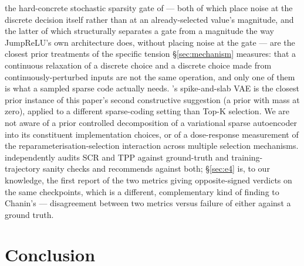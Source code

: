 \documentclass[11pt]{article}
\begin{document}
the hard-concrete
stochastic sparsity gate of \citet{louizos2018learning} --- both of which
place noise at the discrete decision itself rather than at an
already-selected value's magnitude, and the latter of which structurally
separates a gate from a magnitude the way JumpReLU's own architecture does,
without placing noise at the gate --- are the closest prior treatments of
the specific tension \S\ref{sec:mechanism} measures: that a continuous
relaxation of a discrete choice and a discrete choice made from
continuously-perturbed inputs are not the same operation, and only one of
them is what a sampled sparse code actually needs.
\citet{tonolini2020variational}'s spike-and-slab VAE is the closest prior
instance of this paper's second constructive suggestion (a prior with mass
at zero), applied to a different sparse-coding setting than Top-K
selection. We are not aware of a prior controlled decomposition of a
variational sparse autoencoder into its constituent implementation choices,
or of a dose-response measurement of the reparameterisation-selection
interaction across multiple selection mechanisms. \citet{chanin2026reliable}
independently audits SCR and TPP against ground-truth and training-
trajectory sanity checks and recommends against both; \S\ref{sec:e4} is, to our knowledge, the first report of the two
metrics giving opposite-signed verdicts on the same checkpoints, which is a
different, complementary kind of finding to Chanin's --- disagreement
between two metrics versus failure of either against a ground truth.

\section{Conclusion}
\label{sec:conclusion}
\end{document}
